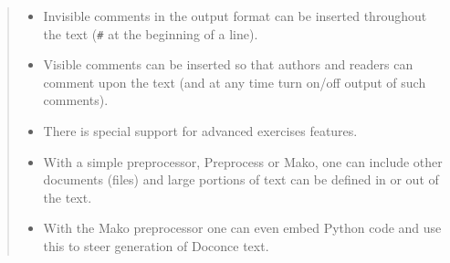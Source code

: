 \documentclass[a4paper]{article}
\begin{document}
\begin{quote}
\begin{itemize}
\item Invisible comments in the output format can be inserted throughout
the text (\texttt{\#} at the beginning of a line).

\item Visible comments can be inserted so that authors and readers can
comment upon the text (and at any time turn on/off output of such
comments).

\item There is special support for advanced exercises features.

\item With a simple preprocessor, Preprocess or Mako, one can include
other documents (files) and large portions of text can be defined
in or out of the text.

\item With the Mako preprocessor one can even embed Python
code and use this to steer generation of Doconce text.

\end{itemize}

\end{quote}
\end{document}
